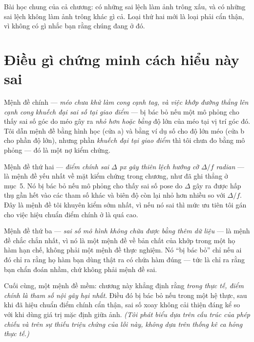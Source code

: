 \documentclass[../../marker.tex]{subfiles}
\begin{document}
\begin{dongian}
Bài học chung của cả chương: có những sai lệch làm ảnh trông xấu, và có những sai lệch không làm ảnh trông khác gì cả. Loại thứ hai mới là loại phải cẩn thận, vì không có gì nhắc bạn rằng chúng đang ở đó.

\end{dongian}

\section{Điều gì chứng minh cách hiểu này sai}

Mệnh đề chính --- \emph{méo chưa khử làm cong cạnh tag, và việc khớp đường thẳng lên cạnh cong khuếch đại sai số tại giao điểm} --- bị bác bỏ nếu một mô phỏng cho thấy sai số góc do méo gây ra \emph{nhỏ hơn hoặc bằng} độ lớn của méo tại vị trí góc đó. Tôi dẫn mệnh đề bằng hình học (cửa a) và bằng ví dụ số cho độ lớn méo (cửa b cho phần độ lớn), nhưng phần \emph{khuếch đại tại giao điểm} thì tôi chưa đo bằng mô phỏng --- đó là một nợ kiểm chứng.

Mệnh đề thứ hai --- \emph{điểm chính sai \(\Delta\) px gây thiên lệch hướng cỡ \(\Delta/f\) radian} --- là mệnh đề yếu nhất về mặt kiểm chứng trong chương, như đã ghi thẳng ở mục~5. Nó bị bác bỏ nếu mô phỏng cho thấy sai số pose do \(\Delta\) gây ra được hấp thụ gần hết vào các tham số khác và biên độ còn lại nhỏ hơn nhiều so với \(\Delta/f\). Đây là mệnh đề tôi khuyên kiểm sớm nhất, vì nếu nó sai thì mức ưu tiên tôi gán cho việc hiệu chuẩn điểm chính ở  là quá cao.

Mệnh đề thứ ba --- \emph{sai số mô hình không chữa được bằng thêm dữ liệu} --- là mệnh đề chắc chắn nhất, vì nó là một mệnh đề về bản chất của khớp trong một họ hàm hạn chế, không phải một mệnh đề thực nghiệm. Nó ``bị bác bỏ'' chỉ nếu ai đó chỉ ra rằng họ hàm bạn dùng thật ra có chứa hàm đúng --- tức là chỉ ra rằng bạn chẩn đoán nhầm, chứ không phải mệnh đề sai.

Cuối cùng, một mệnh đề mềm: chương này khẳng định rằng \emph{trong thực tế, điểm chính là tham số nội gây hại nhất}. Điều đó bị bác bỏ nếu trong một hệ thực, sau khi đã hiệu chuẩn điểm chính cẩn thận, sai số xoay không cải thiện đáng kể so với khi dùng giá trị mặc định giữa ảnh. \emph{(Tôi phát biểu dựa trên cấu trúc của phép chiếu và trên sự thiếu triệu chứng của lỗi này, không dựa trên thống kê ca hỏng thực tế.)}
\end{document}
